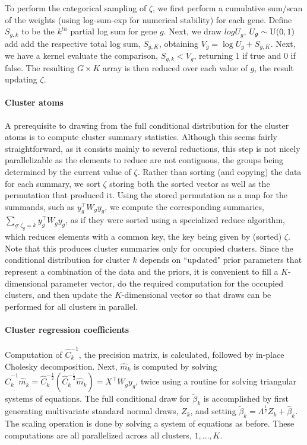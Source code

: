To perform the categorical sampling of $\zeta$, we first perform a cumulative sum/scan of the weights (using log-sum-exp for numerical stability) for each gene. Define $S_{g,k}$ to be the $k^{th}$ partial log sum for gene $g$. Next, we draw $log U_g$, $U_g \sim \operatorname{U}(0,1)$ add add the respective total log sum, $S_{g,K}$, obtaining $V_g = \log U_g + S_{g,K}$. Next, we have a kernel evaluate the comparison, $S_{g,k}<V_g$, returning $1$ if true and $0$ if false. The resulting $G\times K$ array is then reduced over each value of $g$, the result updating $\zeta$.

\paragraph{Cluster atoms}
A prerequisite to drawing from the full conditional distribution for the cluster atoms is to compute cluster summary statistics. Although this seems fairly straightforward, as it consists mainly to several reductions, this step is not nicely parallelizable as the elements to reduce are not contiguous, the groups being determined by the current value of $\zeta$. Rather than sorting (and copying) the data for each summary, we sort $\zeta$ storing both the sorted vector as well as the permutation that produced it. Using the stored permutation as a map for the summands, such as $y_g^\top W_g y_g$, we compute the corresponding summaries, $\sum_{g:\zeta_g=k}y_g^\top W_g y_g$, as if they were sorted using a specialized reduce algorithm, which reduces elements with a common key, the key being given by (sorted) $\zeta$. Note that this produces cluster summaries only for occupied clusters. Since the conditional distribution for cluster $k$ depends on ``updated" prior parameters that represent a combination of the data and the priors, it is convenient to fill a $K$-dimensional parameter vector, do the required computation for the occupied clusters, and then update the $K$-dimensional vector so that draws can be performed for all clusters in parallel.

\paragraph{Cluster regression coefficients}
Computation of
$\hat{C}_k^{-1}$, the precision matrix, is calculated, followed
by in-place Cholesky decomposition. Next, $\hat{m}_k$ is computed
by solving
$\hat{C}_k^{-1}\hat{m}_k=\hat{C}_k^{-\frac{1}{2}}\left(\hat{C}_k^{-\frac{1}{2}}\hat{m}_k\right)
= X^\top W_g y_g$, twice using a routine for solving triangular
systems of equations. The full conditional draw for $\tilde{\beta}_k$ is
accomplished by first generating multivariate standard normal draws, $Z_k$, and setting $\tilde{\beta}_k =
\Lambda^{\frac{1}{2}} Z_k + \hat{\beta}_k$. The scaling operation is
done by solving a system of equations as before. These
computations are all parallelized across all clusters, $1,\ldots,K$.

